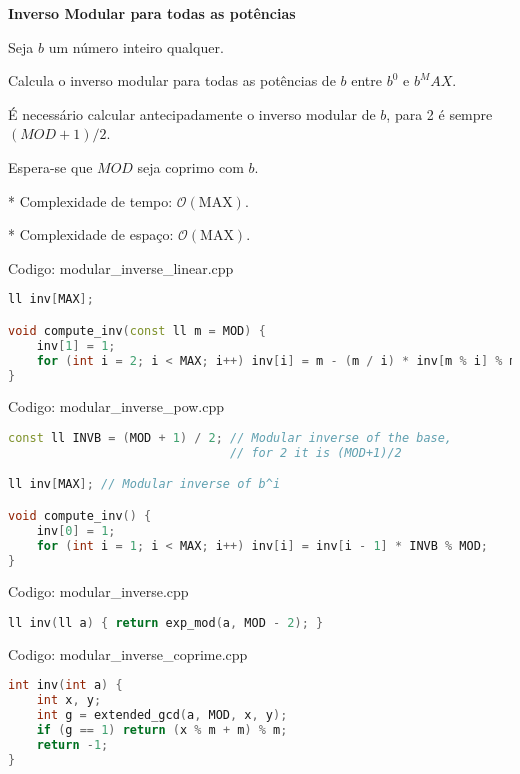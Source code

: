 \documentclass[10pt, a4paper, oneside]{book}
\begin{document}
\textbf{Inverso Modular para todas as potências} 



Seja $b$ um número inteiro qualquer.



Calcula o inverso modular para todas as potências de $b$ entre $b^0$ e $b^MAX$.



É necessário calcular antecipadamente o inverso modular de $b$, para 2 é sempre $(MOD+1)/2$.



Espera-se que $MOD$ seja coprimo com $b$.



* Complexidade de tempo: $\mathcal{O}(\text{MAX})$.

* Complexidade de espaço: $\mathcal{O}(\text{MAX})$.
\hfill

Codigo: modular\_inverse\_linear.cpp

\begin{lstlisting}[language=C++]
ll inv[MAX];

void compute_inv(const ll m = MOD) {
    inv[1] = 1;
    for (int i = 2; i < MAX; i++) inv[i] = m - (m / i) * inv[m % i] % m;
}
\end{lstlisting}
\hfill

Codigo: modular\_inverse\_pow.cpp

\begin{lstlisting}[language=C++]
const ll INVB = (MOD + 1) / 2; // Modular inverse of the base,
                               // for 2 it is (MOD+1)/2

ll inv[MAX]; // Modular inverse of b^i

void compute_inv() {
    inv[0] = 1;
    for (int i = 1; i < MAX; i++) inv[i] = inv[i - 1] * INVB % MOD;
}
\end{lstlisting}
\hfill

Codigo: modular\_inverse.cpp

\begin{lstlisting}[language=C++]
ll inv(ll a) { return exp_mod(a, MOD - 2); }
\end{lstlisting}
\hfill

Codigo: modular\_inverse\_coprime.cpp

\begin{lstlisting}[language=C++]
int inv(int a) {
    int x, y;
    int g = extended_gcd(a, MOD, x, y);
    if (g == 1) return (x % m + m) % m;
    return -1;
}
\end{lstlisting}
\hfill
\end{document}

